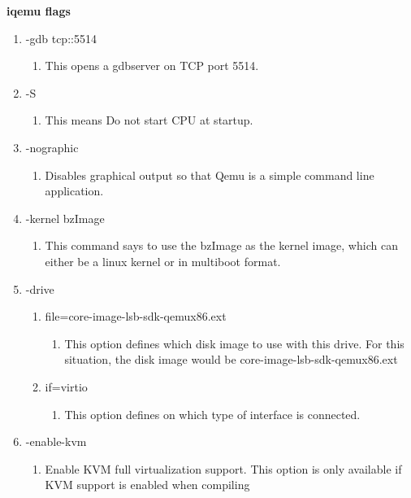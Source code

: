 \documentclass[letterpaper,10pt,fleqn]{article}
\begin{document}
\textbf{iqemu flags}
\begin{enumerate}

\item -gdb tcp::5514
	\begin{enumerate}
		\item 	This opens a gdbserver on TCP port 5514.
	\end{enumerate}

\item -S
	\begin{enumerate}
		\item 	This means Do not start CPU at startup.
	\end{enumerate}

\item -nographic
	\begin{enumerate}
		\item 	Disables graphical output so that Qemu is a simple command line application.
	\end{enumerate}

\item -kernel bzImage
	\begin{enumerate}
		\item 	This command says to use the bzImage as the kernel image, which can either be a linux kernel or in multiboot format.
	\end{enumerate}

\item -drive
	\begin{enumerate}
		\item file=core-image-lsb-sdk-qemux86.ext
			\begin{enumerate}
				\item This option defines which disk image to use with this drive. For this situation, the disk image would be core-image-lsb-sdk-qemux86.ext
			\end{enumerate}
		\item if=virtio
			\begin{enumerate}
				\item This option defines on which type of interface is connected. 
			\end{enumerate}
	\end{enumerate}

\item -enable-kvm
	\begin{enumerate}
		\item Enable KVM full virtualization support. This option is only available if KVM support is enabled when compiling
	\end{enumerate}


\end{enumerate}
\end{document}
